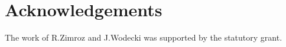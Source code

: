 \documentclass[11pt]{article}
\begin{document}





\section*{Acknowledgements}
The work of R.Zimroz and J.Wodecki was supported by the statutory grant.







\end{document}
